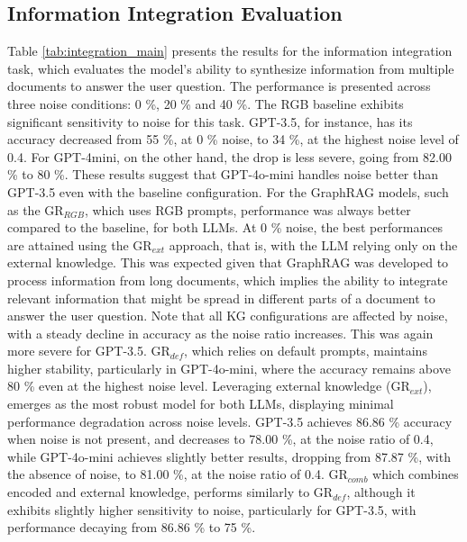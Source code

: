 \documentclass[letterpaper, 10 pt, conference]{ieeeconf}  %
\begin{document}
\subsection{Information Integration Evaluation}
Table \ref{tab:integration_main} presents the results for the information integration task, which evaluates the model's ability to synthesize information from multiple documents to answer the user question. The performance is presented across three noise conditions: 0 \%, 20 \% and 40 \%. The RGB baseline exhibits significant sensitivity to noise for this task. GPT-3.5, for instance, has its accuracy decreased from 55 \%, at 0 \% noise, to 34 \%, at the highest noise level of 0.4. For GPT-4mini, on the other hand, the drop is less severe, going from 82.00 \% to 80 \%. These results suggest that GPT-4o-mini handles noise better than GPT-3.5 even with the baseline configuration. For the GraphRAG models, such as the GR$_{RGB}$, which uses RGB prompts, performance was always better compared to the baseline, for both LLMs. At 0 \% noise, the best performances are attained using the GR$_{ext}$ approach, that is, with the LLM relying only on the external knowledge. This was expected given that GraphRAG was developed to process information from long documents, which implies the ability to integrate relevant information that might be spread in different parts of a document to answer the user question. Note that all KG configurations are affected by noise, with a steady decline in accuracy as the noise ratio increases. This was again more severe for GPT-3.5. GR$_{def}$, which relies on default prompts, maintains higher stability, particularly in GPT-4o-mini, where the accuracy remains above 80 \% even at the highest noise level. Leveraging external knowledge (GR$_{ext}$), emerges as the most robust model for both LLMs, displaying minimal performance degradation across noise levels. GPT-3.5 achieves 86.86 \% accuracy when noise is not present, and decreases to 78.00 \%, at the noise ratio of 0.4, while GPT-4o-mini achieves slightly better results, dropping from 87.87 \%, with the absence of noise, to 81.00 \%, at the noise ratio of 0.4. GR$_{comb}$ which combines encoded and external knowledge, performs similarly to GR$_{def}$, although it exhibits slightly higher sensitivity to noise, particularly for GPT-3.5, with performance decaying from 86.86 \% to 75 \%.



\end{document}
